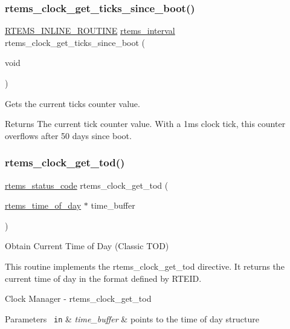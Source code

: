 \subsubsection{\texorpdfstring{rtems\_clock\_get\_ticks\_since\_boot()}{rtems\_clock\_get\_ticks\_since\_boot()}}
{\footnotesize\ttfamily \mbox{\hyperlink{group__RTEMSScoreBaseDefs_gac216239df231d5dbd15e3520b0b9313f}{R\+T\+E\+M\+S\+\_\+\+I\+N\+L\+I\+N\+E\+\_\+\+R\+O\+U\+T\+I\+NE}} \mbox{\hyperlink{group__ClassicTasks_gad39c43f949683d46874e3a5586b93aee}{rtems\+\_\+interval}} rtems\+\_\+clock\+\_\+get\+\_\+ticks\+\_\+since\+\_\+boot (\begin{DoxyParamCaption}\item[{void}]{ }\end{DoxyParamCaption})}



Gets the current ticks counter value. 

\begin{DoxyReturn}{Returns}
The current tick counter value. With a 1ms clock tick, this counter overflows after 50 days since boot. 
\end{DoxyReturn}
\mbox{\label{group__ClassicClock_gab393605047b6f9a1f400eac9205b5e2e}} 
\subsubsection{\texorpdfstring{rtems\_clock\_get\_tod()}{rtems\_clock\_get\_tod()}}
{\footnotesize\ttfamily \mbox{\hyperlink{group__ClassicStatus_ga545d41846817eaba6143d52ee4d9e9fe}{rtems\+\_\+status\+\_\+code}} rtems\+\_\+clock\+\_\+get\+\_\+tod (\begin{DoxyParamCaption}\item[{\mbox{\hyperlink{structrtems__time__of__day}{rtems\+\_\+time\+\_\+of\+\_\+day}} $\ast$}]{time\+\_\+buffer }\end{DoxyParamCaption})}



Obtain Current Time of Day (Classic T\+OD) 

This routine implements the rtems\+\_\+clock\+\_\+get\+\_\+tod directive. It returns the current time of day in the format defined by R\+T\+E\+ID.

Clock Manager -\/ rtems\+\_\+clock\+\_\+get\+\_\+tod


\begin{DoxyParams}[1]{Parameters}
\mbox{\texttt{ in}}  & {\em time\+\_\+buffer} & points to the time of day structure\\
\hline
\end{DoxyParams}

